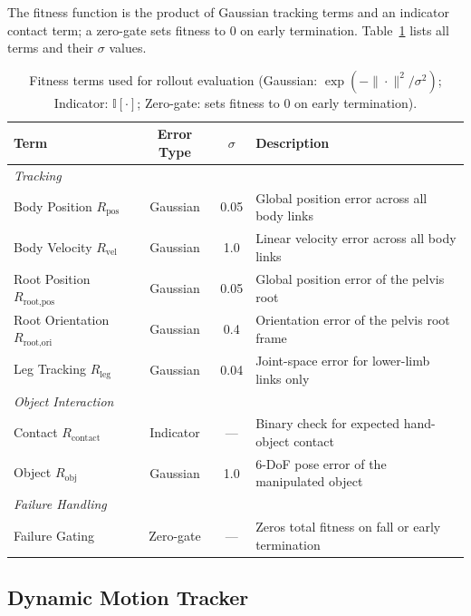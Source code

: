 \documentclass{article}
\begin{document}
The fitness function is the product of Gaussian tracking terms and an indicator contact term; a zero-gate sets fitness to $0$ on early termination. Table~\ref{tab:fitness_terms} lists all terms and their $\sigma$ values.
\begin{table}[h]
\centering
\caption{Fitness terms used for rollout evaluation (Gaussian: $\exp(-\|\cdot\|^2/\sigma^2)$; Indicator: $\mathbb{I}[\cdot]$; Zero-gate: sets fitness to $0$ on early termination).}
\label{tab:fitness_terms}
\small
\setlength{\tabcolsep}{5pt}
\renewcommand{\arraystretch}{1.2}
\begin{tabular}{@{}lccp{6.0cm}@{}}
\toprule
\textbf{Term} & \textbf{Error Type} & $\sigma$ & \textbf{Description} \\
\midrule
\multicolumn{4}{l}{\textit{Tracking}} \\
\midrule
Body Position    $R_{\text{pos}}$       & Gaussian  & 0.05 & Global position error across all body links \\
Body Velocity    $R_{\text{vel}}$       & Gaussian  & 1.0  & Linear velocity error across all body links \\
Root Position    $R_{\text{root,pos}}$  & Gaussian  & 0.05 & Global position error of the pelvis root \\
Root Orientation $R_{\text{root,ori}}$  & Gaussian  & 0.4  & Orientation error of the pelvis root frame \\
Leg Tracking     $R_{\text{leg}}$       & Gaussian  & 0.04 & Joint-space error for lower-limb links only \\
\midrule
\multicolumn{4}{l}{\textit{Object Interaction}} \\
\midrule
Contact $R_{\text{contact}}$            & Indicator & ---  & Binary check for expected hand-object contact \\
Object  $R_{\text{obj}}$                & Gaussian  & 1.0  & 6-DoF pose error of the manipulated object \\
\midrule
\multicolumn{4}{l}{\textit{Failure Handling}} \\
\midrule
Failure Gating                          & Zero-gate & ---  & Zeros total fitness on fall or early termination \\
\bottomrule
\end{tabular}
\end{table}

\subsection{Dynamic Motion Tracker}
\label{app:tracker}
\end{document}
